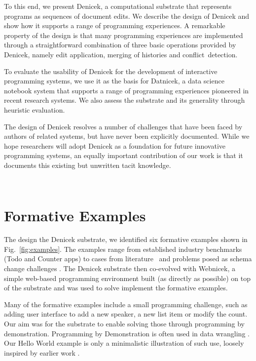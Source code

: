 \documentclass[sigconf,anonymous,screen]{acmart}
\begin{document}
To this end, we present Denicek, a computational substrate that represents programs as sequences
of document edits. We describe the design of Denicek and show how it supports a range of
programming experiences. A remarkable property of the design is that many programming experiences are
implemented through a straightforward combination of three basic operations provided by Denicek, namely edit
application, merging of histories and conflict~detection.

To evaluate the usability of Denicek for the development of interactive programming systems,
we use it as the basis for Datnicek, a data science notebook system that supports a range of
programming experiences pioneered in recent research systems. We also assess the substrate and
its generality through heuristic evaluation.

The design of Denicek resolves a number of challenges that have been faced by authors of related
systems, but have never been explicitly documented. While we hope researchers will adopt
Denicek as a foundation for future innovative programming systems, an equally important
contribution of our work is that it documents this existing but unwritten tacit knowledge.






\newpage
~
\newpage



\appendix
\section{Formative Examples}
\label{app:examples}

The design the Denicek substrate, we identified six formative examples shown in
Fig.~\ref{fig:examples}. The examples range from established industry benchmarks
(Todo and Counter apps) to cases from literature~\cite{edwards-2022-copypaste} and
problems posed as schema change challenges \cite{edwards-2025-schema}.
The Denicek substrate then co-evolved with Webnicek, a simple web-based programming environment
built (as directly as possible) on top of the substrate and was used to solve implement the
formative examples.

Many of the formative examples include a small programming challenge, such as adding
user interface to add a new speaker, a new list item or modify the count. Our aim was for
the substrate to enable solving  those through programming by demonstration.
Programming by Demonstration is often used in data wrangling
\cite{gulwani-2012-spreadsheets,drossos-2020-wrex,gulwani-2014-flash}. Our Hello World example
is only a minimalistic illustration of such use, loosely inspired by earlier work \cite{miller-2001-simult}.
\end{document}
